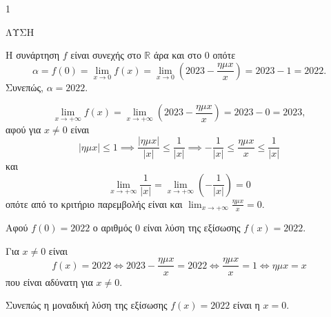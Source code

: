 \begin{ylh}{1}
    \item [Ύλη από εικόνα]
\end{ylh}
ΛΥΣΗ

\begin{alist}
\item Η συνάρτηση $f$ είναι συνεχής στο $\mathbb{R}$ άρα και στο $0$ οπότε
\[ \alpha = f(0) = \lim_{x \to 0} f(x) = \lim_{x \to 0} \left(2023 - \frac{\eta \mu x}{x}\right) = 2023 - 1 = 2022 . \]
Συνεπώς, $\alpha = 2022$. 
\item \[ \lim_{x \to +\infty} f(x) = \lim_{x \to +\infty} \left(2023 - \frac{\eta \mu x}{x}\right) = 2023 - 0 = 2023 , \]
αφού για $x \ne 0$ είναι
\[ |\eta \mu x| \le 1 \implies \frac{|\eta \mu x|}{|x|} \le \frac{1}{|x|} \implies -\frac{1}{|x|} \le \frac{\eta \mu x}{x} \le \frac{1}{|x|} \]
και
\[ \lim_{x \to +\infty} \frac{1}{|x|} = \lim_{x \to +\infty} \left(-\frac{1}{|x|}\right) = 0 \]
οπότε από το κριτήριο παρεμβολής είναι και $\lim_{x \to +\infty} \frac{\eta \mu x}{x} = 0$. 
\item Αφού $f(0) = 2022$ ο αριθμός $0$ είναι λύση της εξίσωσης $f(x) = 2022$.

Για $x \ne 0$ είναι
\[ f(x) = 2022 \iff 2023 - \frac{\eta \mu x}{x} = 2022 \iff \frac{\eta \mu x}{x} = 1 \iff \eta \mu x = x \]
που είναι αδύνατη για $x \ne 0$.

Συνεπώς η μοναδική λύση της εξίσωσης $f(x) = 2022$ είναι η $x = 0$. 
\end{alist}